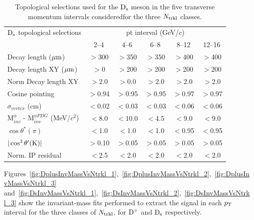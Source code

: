 \begin{table}[h!]
\centering
\begin{tabular}{|l|c|c|c|c|c|}
\hline
${\rm D_s}$ topological selections & \multicolumn{5}{c|}{pt interval (GeV/$c$)}\\
\cline{2-6}
  & 2--4  & 4--6 & 6--8 & 8--12 & 12--16\\
\hline
Decay length ($\mathrm{\mu m}$)        & $>$300 & $>$350 & $>$350 & $>$400& $>$400\\
Decay length XY ($\mathrm{\mu m}$)     & $>$0 & $>$200 & $>$200 & $>$200 & $>$200\\
Norm Decay length XY          & $>$2.0& $>$0.0 & $>$2.0 & $>$2.0 & $>$2.0\\
Cosine pointing              & $>$0.94 & $>$0.95 & $>$0.95 & $>$0.97 & $>$0.97\\
$\sigma_{vertex}$  (cm)          & $<$0.02 & $<$0.03 & $<$0.03 & $<$0.06 & $<$0.06\\
M$^{\phi}_{inv}$ - M$^{\phi PDG}_{inv}$ (MeV/$c^{2}$) & $<$8.0 & $<$10.0 & $<$4.5 & $<$9.0 & $<$9.0\\
$\cos \theta^*(\pi)$    & $<$1.0 & $<$1.0 & $<$1.0 & $<$0.95 & $<$0.95\\
$|\cos^3 \theta^\prime({\rm K})|$        & $>$0.10 & $>$0.05 & $>$0.05 & $>$0.05 & $>$0.05\\
Norm. IP residual  & $<$2.5 & $<$2.0 & $<$2.0 & $<$2.0  & $<$2.0 \\
\hline
\end{tabular}
\caption{Topological selections used for the ${\rm D_s}$ meson in the five transverse momentum intervals consideredfor the three $N_{\rm trkl}$ classes.}
\label{tab:cutsDsVsNtrkl}
\end{table}

Figures~\ref{fig:DplusInvMassVsNtrkl_1},~\ref{fig:DplusInvMassVsNtrkl_2},~\ref{fig:DplusInvMassVsNtrkl_3}  and~\ref{fig:DsInvMassVsNtrkl_1},~\ref{fig:DsInvMassVsNtrkl_2},~\ref{fig:DsInvMassVsNtrkl_3} show the invariant-mass fits performed to extract the signal in each $p_{\rm T}$ interval for the three classes of $N_{\rm trkl}$, for ${\rm D^+}$ and ${\rm D_s}$ respectively. 

